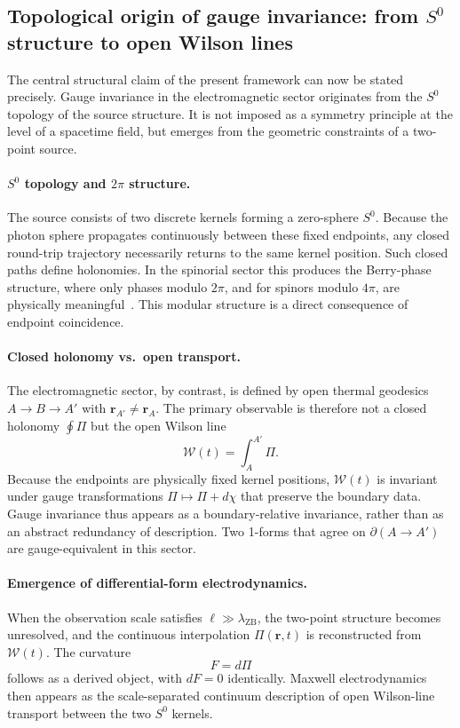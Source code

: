 \documentclass[%
 reprint, amsmath,amssymb, aps, prb, ]{revtex4-2}
\numberwithin{equation}{section}
\newcommand{\WL}{\mathcal{W}}
\begin{document}
\subsection{Topological origin of gauge invariance: from $S^0$ structure to open Wilson lines}
\label{sec:topogauge}

The central structural claim of the present framework can now be stated precisely. Gauge invariance in the electromagnetic sector originates from the $S^0$ topology of the source structure. It is not imposed as a symmetry principle at the level of a spacetime field, but emerges from the geometric constraints of a two-point source.

\paragraph{$S^0$ topology and $2\pi$ structure.}
The source consists of two discrete kernels forming a zero-sphere $S^0$. Because the photon sphere propagates continuously between these fixed endpoints, any closed round-trip trajectory necessarily returns to the same kernel position. Such closed paths define holonomies. In the spinorial sector this produces the Berry-phase structure, where only phases modulo $2\pi$, and for spinors modulo $4\pi$, are physically meaningful~\cite{Berry1984,hanamura29}. This modular structure is a direct consequence of endpoint coincidence.

\paragraph{Closed holonomy vs.\ open transport.}
The electromagnetic sector, by contrast, is defined by open thermal geodesics $A\to B\to A'$ with $\mathbf{r}_{A'}\neq\mathbf{r}_A$. The primary observable is therefore not a closed holonomy $\oint\Pi$ but the open Wilson line
\begin{equation}
\WL(t) = \int_A^{A'}\Pi.
\label{eq:WL_primary}
\end{equation}
Because the endpoints are physically fixed kernel positions, $\WL(t)$ is invariant under gauge transformations $\Pi\mapsto\Pi+d\chi$ that preserve the boundary data. Gauge invariance thus appears as a boundary-relative invariance, rather than as an abstract redundancy of description. Two 1-forms that agree on $\partial(A\to A')$ are gauge-equivalent in this sector.

\paragraph{Emergence of differential-form electrodynamics.}
When the observation scale satisfies $\ell\gg\lambda_{\text{ZB}}$, the two-point structure becomes unresolved, and the continuous interpolation $\Pi(\mathbf{r},t)$ is reconstructed from $\WL(t)$. The curvature
\begin{equation}
F = d\Pi
\label{eq:F_recall}
\end{equation}
follows as a derived object, with $dF=0$ identically. Maxwell electrodynamics then appears as the scale-separated continuum description of open Wilson-line transport between the two $S^0$ kernels.
\end{document}
